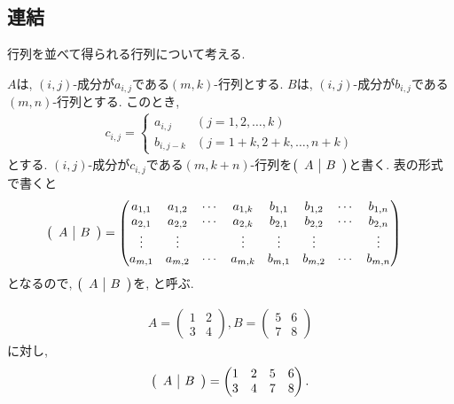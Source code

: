 \subsection{連結}
行列を並べて得られる行列について考える.
\begin{definition}
  $A$は, $(i,j)$-成分が$a_{i,j}$である$(m,k)$-行列とする.
  $B$は, $(i,j)$-成分が$b_{i,j}$である$(m,n)$-行列とする.  
  このとき,
  \begin{align*}
    c_{i,j}=
    \begin{cases}
      a_{i,j} &(j=1,2,\ldots,k)\\
      b_{i,j-k}&(j=1+k,2+k,\ldots,n+k)
    \end{cases}
  \end{align*}
  とする.
  $(i,j)$-成分が$c_{i,j}$である$(m,k+n)$-行列を$\left(\begin{array}{c|c}A& B\end{array}\right)$と書く.
  表の形式で書くと
  \begin{align*}
    \left(\begin{array}{c|c}A& B\end{array}\right)
    &=
    \begin{pmatrix}
      a_{1,1}&a_{1,2}&\cdots&a_{1,k}&b_{1,1}&b_{1,2}&\cdots&b_{1,n}\\
      a_{2,1}&a_{2,2}&\cdots&a_{2,k}&b_{2,1}&b_{2,2}&\cdots&b_{2,n}\\
      \vdots&\vdots&&\vdots&\vdots&\vdots&&\vdots\\
      a_{m,1}&a_{m,2}&\cdots&a_{m,k}&b_{m,1}&b_{m,2}&\cdots&b_{m,n}\\
    \end{pmatrix}
  \end{align*}
  となるので,
  $\left(\begin{array}{c|c}A& B\end{array}\right)$を,
  と呼ぶ. 
\end{definition}

\begin{example}
  \begin{align*}
    A=\begin{pmatrix}1&2\\3&4\end{pmatrix},
    B=\begin{pmatrix}5&6\\7&8\end{pmatrix}
  \end{align*}
  に対し,
  \begin{align*}
    \left(\begin{array}{c|c}A& B\end{array}\right)=
    \begin{pmatrix}1&2&5&6\\3&4&7&8\end{pmatrix}.
  \end{align*}
\end{example}



